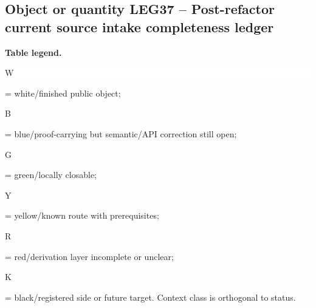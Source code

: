 \subsection*{Object or quantity LEG37 -- Post-refactor current source intake completeness ledger}
\hypertarget{objproof:LEG37}{}
\par\smallskip\noindent\begin{minipage}{0.99\linewidth}\footnotesize\raggedright\textbf{Table legend.} \colorbox{white}{\strut W} = white/finished public object; \colorbox{cyan!20}{\strut B} = blue/proof-carrying but semantic/API correction still open; \colorbox{green!18}{\strut G} = green/locally closable; \colorbox{yellow!25}{\strut Y} = yellow/known route with prerequisites; \colorbox{red!20}{\strut R} = red/derivation layer incomplete or unclear; \colorbox{black!18}{\strut K} = black/registered side or future target. Context class is orthogonal to status.\end{minipage}\par\vspace{0.25em}
